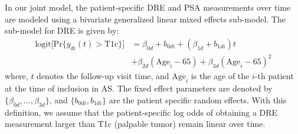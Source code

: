 
In our joint model, the patient-specific DRE and PSA measurements over time are modeled using a bivariate generalized linear mixed effects sub-model. The sub-model for DRE is given by:
\begin{equation}
\label{eq:long_model_dre}
\begin{split}
    \mbox{logit} \big[\mbox{Pr}\{y_{di}(t) > \mbox{T1c}\}\big] &= \beta_{0d} + b_{0di} + (\beta_{1d} + b_{1di}) t\\
    &+ \beta_{2d} (\mbox{Age}_i-65) + \beta_{3d} (\mbox{Age}_i-65)^2
    \end{split}
\end{equation}
where, $t$ denotes the follow-up visit time, and $\mbox{Age}_i$ is the age of the ${i\mbox{-th}}$ patient at the time of inclusion in AS. The fixed effect parameters are denoted by ${\{\beta_{0d}, \ldots, \beta_{3d}\}}$, and ${\{b_{0di}, b_{1di}\}}$ are the patient specific random effects. With this definition, we assume that the patient-specific log odds of obtaining a DRE measurement larger than T1c (palpable tumor) remain linear over time. 

